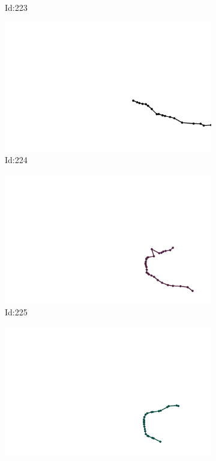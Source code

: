 \documentclass[12pt,twoside]{report}
\begin{document}
\begin{figure}
\begin{subfigure}[b]{0.20\textwidth}
\caption{Id:223}
\end{subfigure}
\begin{subfigure}[b]{0.20\textwidth}
\centering
\includegraphics[width=\textwidth]{../trajectories/224.png}
\caption{Id:224}
\end{subfigure}
\begin{subfigure}[b]{0.20\textwidth}
\centering
\includegraphics[width=\textwidth]{../trajectories/225.png}
\caption{Id:225}
\end{subfigure}
\begin{subfigure}[b]{0.20\textwidth}
\centering
\includegraphics[width=\textwidth]{../trajectories/227.png}

\end{subfigure}
\end{figure}
\end{document}
